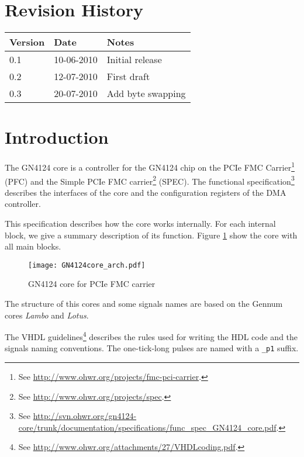 \documentclass[10pt,a4paper]{cerndoc}
\begin{document}
  \cerntitle
  \section*{Revision History}
  \begin{tabularx}{\textwidth}{|p{3cm}|p{3cm}|X|}
    \hline \textbf{Version}&\textbf{Date}&\textbf{Notes}\\ \hline \hline
    0.1 & 10-06-2010 & Initial release\\ \hline
    0.2 & 12-07-2010 & First draft\\ \hline
    0.3 & 20-07-2010 & Add byte swapping\\ \hline

  \end{tabularx}

  \tableofcontents
  \listoffigures
  \clearpage

  \section*{Introduction}
The GN4124 core is a controller for the GN4124 chip on the PCIe FMC Carrier\footnote{See \href{http://www.ohwr.org/projects/fmc-pci-carrier}{http://www.ohwr.org/projects/fmc-pci-carrier}.} (PFC) and the Simple PCIe FMC carrier\footnote{See \href{http://www.ohwr.org/projects/spec}{http://www.ohwr.org/projects/spec}.} (SPEC).
The functional specification\footnote{See \href{http://svn.ohwr.org/gn4124-core/trunk/documentation/specifications/func_spec_GN4124_core.pdf}{http://svn.ohwr.org/gn4124-core/trunk/documentation/specifications/func\_spec\_GN4124\_core.pdf}.} describes the interfaces of the core and the configuration registers of the DMA controller.

This specification describes how the core works internally. For each internal block, we give a summary description of its function. Figure \ref{fig:GN4124core_arch} show the core with all main blocks. 




\begin{figure}[!ht]
  \centering
    \texttt{[image: GN4124core\_arch.pdf]}
  \caption{GN4124 core for PCIe FMC carrier}
  \label{fig:GN4124core_arch}
\end{figure}

The structure of this cores and some signals names are based on the Gennum cores \emph{Lambo} and \emph{Lotus}.
 
The VHDL guidelines\footnote{See \href{http://www.ohwr.org/attachments/27/VHDLcoding.pdf}{http://www.ohwr.org/attachments/27/VHDLcoding.pdf}.} describes the rules used for writing the HDL code and the signals naming conventions. The one-tick-long pulses are named with a \verb+_p1+ suffix.
\end{document}

